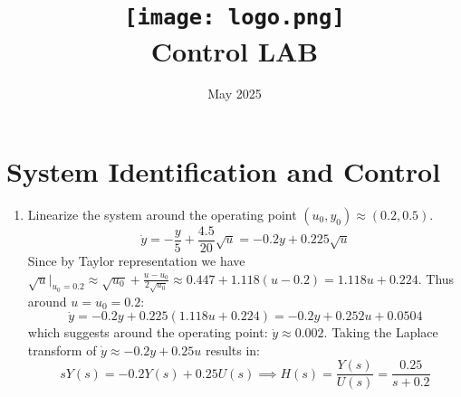 \documentclass{article}
\title{
  \vspace{-2em}
  \texttt{[image: logo.png]} \\
  \vspace{0.5em}
  Control LAB \\
  \exerciseset
}
\author{\FirstAuthor \and \SecondAuthor}
\date{May 2025}
\begin{document}
\maketitle

\section{System Identification and Control}
\begin{enumerate}
  \item Linearize the system around the operating point $(u_0,y_0)\approx(0.2,0.5)$.
  \begin{equation*}
    \dot{y} = -\frac{y}{5} + \frac{4.5}{20}\sqrt{u} = -0.2 y + 0.225 \sqrt{u}
  \end{equation*}
  Since by Taylor representation we have $\sqrt{u}|_{u_0=0.2} \approx \sqrt{u_0} + \frac{u-u_0}{2\sqrt{u_0}} \approx 0.447 + 1.118(u-0.2) = 1.118u + 0.224$. Thus around $u=u_0=0.2$:
  \begin{equation*}
    \dot{y} = -0.2y + 0.225(1.118u + 0.224) = -0.2y + 0.252u + 0.0504
  \end{equation*}
  which suggests around the operating point: $\dot{y} \approx 0.002$. Taking the Laplace transform of $\dot{y} \approx -0.2y + 0.25u$ results in:
  \begin{equation*}
    sY(s) = -0.2Y(s) + 0.25 U(s) \implies H(s) = \frac{Y(s)}{U(s)} = \frac{0.25}{s + 0.2}
  \end{equation*}


\end{enumerate}
\end{document}
